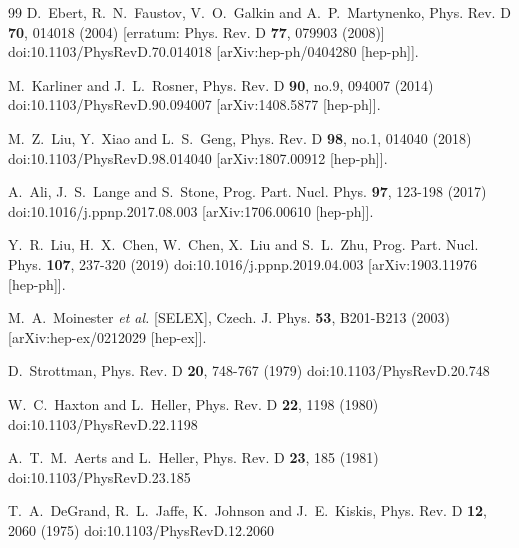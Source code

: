 \documentclass[prd,twocolumn,floatfix,nofootinbib]{revtex4}
\begin{document}
\begin{thebibliography}{99}
    D.~Ebert, R.~N.~Faustov, V.~O.~Galkin and A.~P.~Martynenko,
    Phys. Rev. D \textbf{70}, 014018 (2004)
    [erratum: Phys. Rev. D \textbf{77}, 079903 (2008)]
    doi:10.1103/PhysRevD.70.014018
    [arXiv:hep-ph/0404280 [hep-ph]].

    M.~Karliner and J.~L.~Rosner,
    Phys. Rev. D \textbf{90}, no.9, 094007 (2014)
    doi:10.1103/PhysRevD.90.094007
    [arXiv:1408.5877 [hep-ph]].

    M.~Z.~Liu, Y.~Xiao and L.~S.~Geng,
    Phys. Rev. D \textbf{98}, no.1, 014040 (2018)
    doi:10.1103/PhysRevD.98.014040
    [arXiv:1807.00912 [hep-ph]].

    A.~Ali, J.~S.~Lange and S.~Stone,
    Prog. Part. Nucl. Phys. \textbf{97}, 123-198 (2017)
    doi:10.1016/j.ppnp.2017.08.003
    [arXiv:1706.00610 [hep-ph]].
    
    Y.~R.~Liu, H.~X.~Chen, W.~Chen, X.~Liu and S.~L.~Zhu,
    Prog. Part. Nucl. Phys. \textbf{107}, 237-320 (2019)
    doi:10.1016/j.ppnp.2019.04.003
    [arXiv:1903.11976 [hep-ph]].

    M.~A.~Moinester \textit{et al.} [SELEX],
    Czech. J. Phys. \textbf{53}, B201-B213 (2003)
    [arXiv:hep-ex/0212029 [hep-ex]].

    D.~Strottman,
    Phys. Rev. D \textbf{20}, 748-767 (1979)
    doi:10.1103/PhysRevD.20.748

    W.~C.~Haxton and L.~Heller,
    Phys. Rev. D \textbf{22}, 1198 (1980)
    doi:10.1103/PhysRevD.22.1198

    A.~T.~M.~Aerts and L.~Heller,
    Phys. Rev. D \textbf{23}, 185 (1981)
    doi:10.1103/PhysRevD.23.185

    T.~A.~DeGrand, R.~L.~Jaffe, K.~Johnson and J.~E.~Kiskis,
    Phys. Rev. D \textbf{12}, 2060 (1975)
    doi:10.1103/PhysRevD.12.2060


\end{thebibliography}
\end{document}
